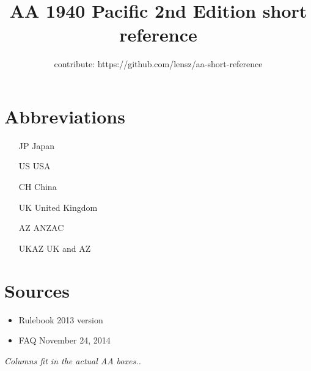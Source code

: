 \documentclass[10pt,a4paper,landscape]{article}
\author{contribute: https://github.com/lensz/aa-short-reference}
\title{AA 1940 Pacific 2nd Edition short reference}
\begin{document}
\maketitle

\section*{Abbreviations}

\begin{enumerate}
\item[JP] Japan
\item[US] USA
\item[CH] China
\item[UK] United Kingdom
\item[AZ] ANZAC
\item[UKAZ] UK and AZ
\end{enumerate}

\section*{Sources}
\begin{itemize}
\item Rulebook 2013 version
\item FAQ November 24, 2014
\end{itemize}


\textsl{Columns fit in the actual AA boxes..}
\end{document}
